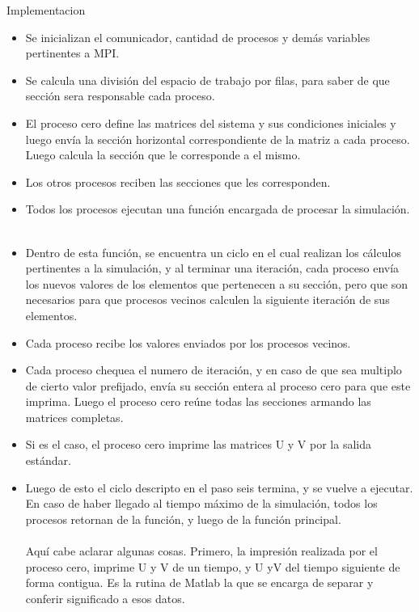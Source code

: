 \begin{section}{Implementacion}
\begin{itemize}
\item Se inicializan el comunicador, cantidad de procesos y demás variables pertinentes a MPI.
~\\
\item Se calcula una división del espacio de trabajo por filas, para saber de que sección sera responsable cada proceso.
~\\
\item El proceso cero define las matrices del sistema y sus condiciones iniciales y luego envía la sección horizontal correspondiente de la matriz a cada proceso. Luego calcula la sección que le corresponde a el mismo.
~\\
\item Los otros procesos reciben las secciones que les corresponden.
~\\
\item Todos los procesos ejecutan una función encargada de procesar la simulación.
~\\
\item Dentro de esta función, se encuentra un ciclo en el cual realizan los cálculos pertinentes a la simulación, y al terminar una iteración, cada proceso envía los nuevos valores de los elementos que pertenecen a su sección, pero que son necesarios para que procesos vecinos calculen la siguiente iteración de sus elementos.
~\\
\item Cada proceso recibe los valores enviados por los procesos vecinos.
~\\
\item Cada proceso chequea el numero de iteración, y en caso de que sea multiplo de cierto valor prefijado, envía su sección entera al proceso cero para que este imprima. Luego el proceso cero reúne todas las secciones armando las matrices completas.
~\\
\item Si es el caso, el proceso cero imprime las matrices U y V por la salida estándar.
~\\
\item Luego de esto el ciclo descripto en el paso seis termina, y se vuelve a ejecutar. En caso de haber llegado al tiempo máximo de la simulación, todos los procesos retornan de la función, y luego de la función principal.
~\\
~\\
Aquí cabe aclarar algunas cosas. Primero, la impresión realizada por el proceso cero, imprime U y V de un tiempo, y U yV del tiempo siguiente de forma contigua. Es la rutina de Matlab la que se encarga de separar y conferir significado a esos datos. 

\end{itemize}
\end{section}
